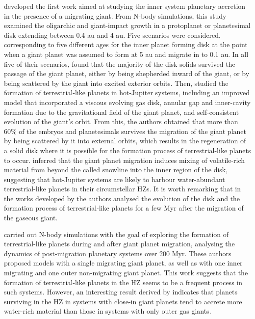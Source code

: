 \documentclass{aa}
\begin{document}
\citet{Fogg2005} developed the first work aimed at studying the inner system planetary accretion in the presence of a
migrating giant. From N-body simulations, this study examined the oligarchic and giant-impact growth in a protoplanet or planetesimal
disk extending between 0.4 au and 4 au. Five scenarios were considered, corresponding to five different ages for the inner planet
forming disk at the point when a giant planet was assumed to form at 5 au and migrate in to 0.1 au. In all five of their scenarios,
\citet{Fogg2005} found that the majority of the disk solids survived the passage of the giant planet, either by being shepherded
inward of the giant, or by being scattered by the giant into excited exterior orbits. Then, \citet{Fogg2007} studied
the formation of terrestrial-like planets in hot-Jupiter systems, including an improved model that incorporated a viscous evolving
gas disk, annular gap and inner-cavity formation due to the gravitational field of the giant planet, and self-consistent evolution of
the giant's orbit. From this, the authors obtained that more than 60\% of the embryos and planetesimals survives the migration
of the giant planet by being scattered by it into external orbits, which results in the regeneration of a solid disk where it is possible for the
formation process of terrestrial-like planets to occur. \citet{Fogg2007} inferred that the giant planet migration induces
mixing of volatile-rich material from beyond the called snowline into the inner region of the disk, suggesting that hot-Jupiter systems
are likely to harbour water-abundant terrestrial-like planets in their circumstellar HZs. It is worth remarking that
in the works developed by \citet{Fogg2005, Fogg2007} the authors analysed the evolution of the disk and the formation process of terrestrial-like planets
for a few Myr after the migration of the gaseous giant.

\citet{Mandell2007} carried out N-body simulations with the goal of exploring the formation of terrestrial-like planets during and after
giant planet migration, analysing the dynamics of post-migration planetary systems over 200 Myr. These authors proposed models with a
single migrating giant planet, as well as with one inner migrating and one outer non-migrating giant planet. This work suggests that the
formation of terrestrial-like planets in the HZ seems to be a frequent process in such systems. However, an interesting result derived by
\citet{Mandell2007} indicates that planets surviving in the HZ in systems with close-in giant planets tend to accrete more water-rich
material than those in systems with only outer gas giants.
\end{document}
